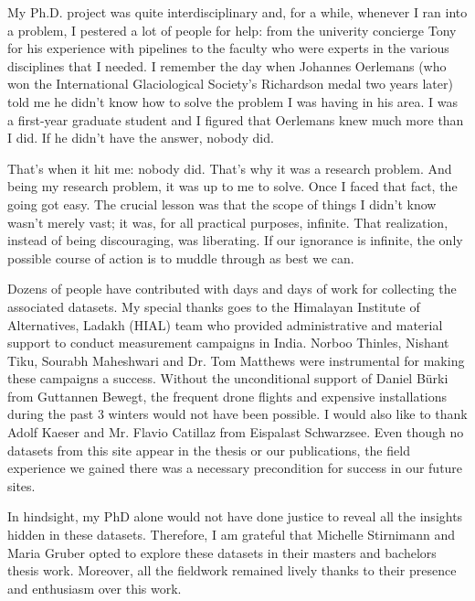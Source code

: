 My Ph.D. project was quite interdisciplinary and, for a while, whenever I ran into a problem, I pestered a
lot of people for help: from the univerity concierge Tony for his experience with pipelines to the faculty who
were experts in the various disciplines that I needed. I remember the day when Johannes Oerlemans (who won the
International Glaciological Society's Richardson medal two years later) told me he didn't know how to solve the
problem I was having in his area. I was a first-year graduate student and I figured that Oerlemans knew much
more than I did. If he didn't have the answer, nobody did.

That's when it hit me: nobody did. That's why it was a research problem. And being my research problem, it was
up to me to solve. Once I faced that fact, the going got easy. The crucial lesson was that the scope of things I
didn't know wasn't merely vast; it was, for all practical purposes, infinite. That realization, instead of being
discouraging, was liberating. If our ignorance is infinite, the only possible course of action is to muddle
through as best we can.

Dozens of people have contributed with days and days of work for collecting the associated datasets. My special
thanks goes to the Himalayan Institute of Alternatives, Ladakh (HIAL) team who provided administrative and
material support to conduct measurement campaigns in India. Norboo Thinles, Nishant Tiku, Sourabh Maheshwari and
Dr. Tom Matthews were instrumental for making these campaigns a success. Without the unconditional support of
Daniel Bürki from Guttannen Bewegt, the frequent drone flights and expensive installations during the past 3
winters would not have been possible. I would also like to thank Adolf Kaeser and Mr. Flavio Catillaz from
Eispalast Schwarzsee. Even though no datasets from this site appear in the thesis or our publications, the field
experience we gained there was a necessary precondition for success in our future sites. 

In hindsight, my PhD alone would not have done justice to reveal all the insights hidden in these datasets.
Therefore, I am grateful that Michelle Stirnimann and Maria Gruber opted to explore these datasets in their
masters and bachelors thesis work. Moreover, all the fieldwork remained lively thanks to their presence and
enthusiasm over this work.

